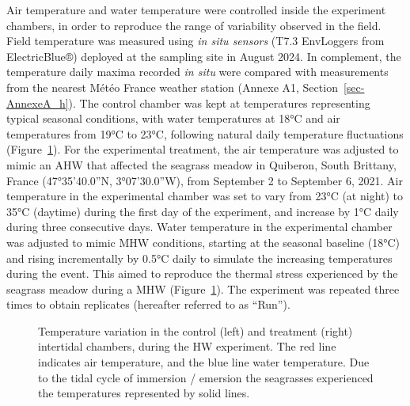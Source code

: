 \documentclass[
  letterpaper,
  11pt,
  english,
  singlespacing,
  headsepline]{MastersDoctoralThesis}
\begin{document}
\begin{spacing}{1.5}
Air temperature and water temperature were controlled inside the
experiment chambers, in order to reproduce the range of variability
observed in the field. Field temperature was measured using \emph{in
situ sensors} (T7.3 EnvLoggers from ElectricBlue®) deployed at the
sampling site in August 2024. In complement, the temperature daily
maxima recorded \emph{in situ} were compared with measurements from the
nearest Météo France weather station (Annexe A1,
Section~\ref{sec-AnnexeA_h}). The control chamber was kept at
temperatures representing typical seasonal conditions, with water
temperatures at 18°C and air temperatures from 19°C to 23°C, following
natural daily temperature fluctuations (Figure~\ref{fig-Profile_h}). For
the experimental treatment, the air temperature was adjusted to mimic an
AHW that affected the seagrass meadow in Quiberon, South Brittany,
France (47°35'40.0''N, 3°07'30.0''W), from September 2 to September 6,
2021. Air temperature in the experimental chamber was set to vary from
23°C (at night) to 35°C (daytime) during the first day of the
experiment, and increase by 1°C daily during three consecutive days.
Water temperature in the experimental chamber was adjusted to mimic MHW
conditions, starting at the seasonal baseline (18°C) and rising
incrementally by 0.5°C daily to simulate the increasing temperatures
during the event. This aimed to reproduce the thermal stress experienced
by the seagrass meadow during a MHW (Figure~\ref{fig-Profile_h}). The
experiment was repeated three times to obtain replicates (hereafter
referred to as ``Run'').

\begin{figure}


\caption{\label{fig-Profile_h}Temperature variation in the control
(left) and treatment (right) intertidal chambers, during the HW
experiment. The red line indicates air temperature, and the blue line
water temperature. Due to the tidal cycle of immersion / emersion the
seagrasses experienced the temperatures represented by solid lines.}


\end{figure}
\end{spacing}
\end{document}
